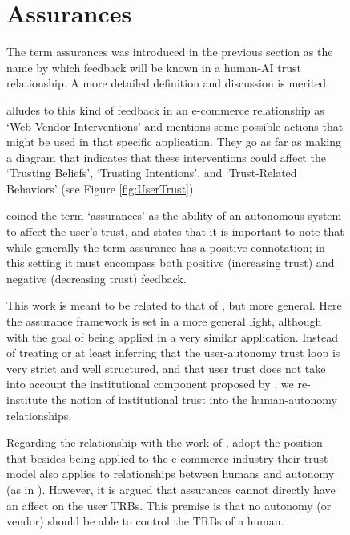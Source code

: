\begin{figure}[htbp]
\section{Assurances}
    The term assurances was introduced in the previous section as the name by which feedback will be known in a human-AI trust relationship. A more detailed definition and discussion is merited.

    \citet{McKnight2001-fa} alludes to this kind of feedback in an e-commerce relationship as `Web Vendor Interventions' and mentions some possible actions that might be used in that specific application. They go as far as making a diagram that indicates that these interventions could affect the `Trusting Beliefs', `Trusting Intentions', and `Trust-Related Behaviors' (see Figure \ref{fig:UserTrust}).
    
    \citet{Lillard2016-yg} coined the term `assurances' as the ability of an autonomous system to affect the user's trust, and states that it is important to note that while generally the term assurance has a positive connotation; in this setting it must encompass both positive (increasing trust) and negative (decreasing trust) feedback.

    This work is meant to be related to that of \citet{Lillard2016-yg}, but more general. Here the assurance framework is set in a more general light, although with the goal of being applied in a very similar application. Instead of treating or at least inferring that the user-autonomy trust loop is very strict and well structured, and that user trust does not take into account the institutional component proposed by \citet{McKnight2001-fa}, we re-institute the notion of institutional trust into the human-autonomy relationships.

    Regarding the relationship with the work of \citet{McKnight2001-fa}, adopt the position that besides being applied to the e-commerce industry their trust model also applies to relationships between humans and autonomy (as in \citet{Lillard2016-yg}). However, it is argued that assurances cannot directly have an affect on the user TRBs. This premise is that no autonomy (or vendor) should be able to control the TRBs of a human.


\end{figure}
